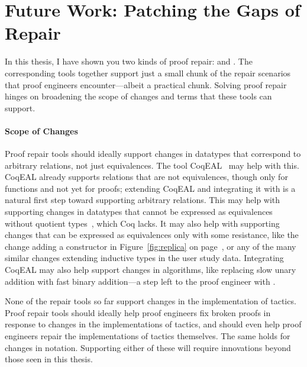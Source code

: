 \section{Future Work: Patching the Gaps of Repair}
\label{sec:more}

In this thesis, I have shown you two kinds of proof repair:  and .
The corresponding tools together support just a small chunk of the repair scenarios that proof engineers encounter---albeit a practical chunk.
Solving proof repair hinges on broadening the scope of changes and terms that these tools can support.

\paragraph{Scope of Changes}
Proof repair tools should ideally support changes in datatypes that correspond to arbitrary relations, not just equivalences.
The tool CoqEAL~\cite{cohen:hal-01113453} may help with this.
CoqEAL already supports relations that are not equivalences, though only for functions and not yet for proofs;
extending CoqEAL and integrating it with \toolnamec is a natural first step toward supporting arbitrary relations.
This may help with supporting changes in datatypes that cannot be expressed as equivalences without quotient types~\cite{angiuli2020internalizing}, which Coq lacks.
It may also help with supporting changes that can be expressed as equivalences only with some resistance,
like the change adding a constructor in Figure~\ref{fig:replica} on page~\pageref{fig:replica},
or any of the many similar changes extending inductive types in the  user study data.
Integrating CoqEAL may also help support changes in algorithms, like replacing slow unary addition with fast binary addition---a step
left to the proof engineer with \toolnamec.

None of the repair tools so far support changes in the implementation of tactics.
Proof repair tools should ideally help proof engineers fix broken proofs in response to changes in the implementations of tactics,
and should even help proof engineers repair the implementations of tactics themselves.
The same holds for changes in notation.
Supporting either of these will require innovations beyond those seen in this thesis.


